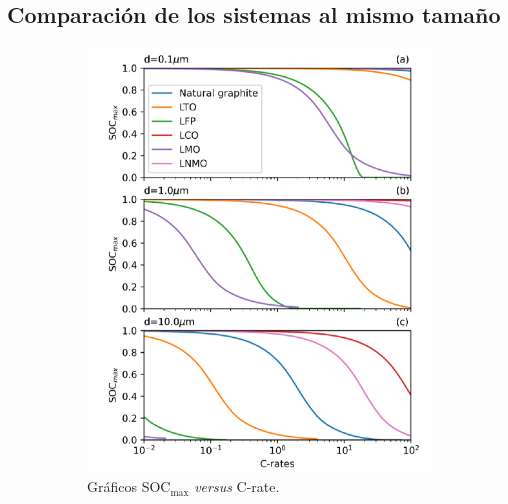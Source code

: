 \subsection{Comparación de los sistemas al mismo tamaño}

\begin{figure}[h!]
    \centering
    \begin{subfigure}{.575\textwidth}
        \centering
        \includegraphics[height=.4\textheight]{FastCharging/un/resultados/comparacion/comparacion-curvas.png}
        \caption{Gráficos SOC$_{\max}$ \textit{versus} C-rate.}
        \label{fig:comparacion-curvas}
    \end{subfigure}
    \begin{subfigure}{.375\textwidth}
        \centering

\end{subfigure}
\end{figure}
